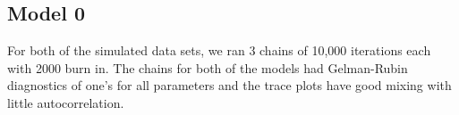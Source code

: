 \documentclass[11pt]{article}\usepackage[]{graphicx}\usepackage[]{color}
\begin{document}
 

\subsection{Model 0}

For both of the simulated data sets, we ran 3 chains of 10,000 iterations each with 2000 burn in. The chains for both of the models had Gelman-Rubin diagnostics of one's for all parameters and the trace plots have good mixing with little autocorrelation. 
\end{document}
